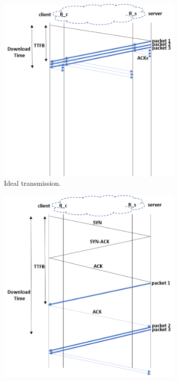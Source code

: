 \documentclass[10pt,sigconf]{acmart}
\begin{document}
\begin{figure}[t]
  \centering
    \begin{subfigure}{0.65\columnwidth}
  \centering
  \includegraphics[width=\columnwidth]{figures/ideal.png}
    \caption{Ideal transmission.}
    \label{fig:ideal}
\end{subfigure}    \centering
\begin{subfigure}{0.65\columnwidth}
  \centering
  \includegraphics[width=\columnwidth]{figures/e2e.png}

\end{subfigure}
\end{figure}
\end{document}
